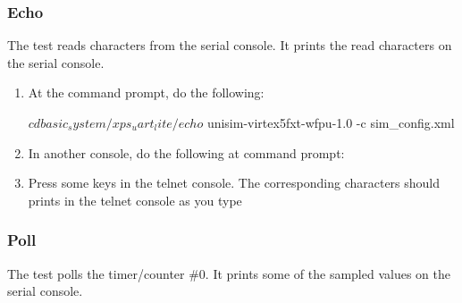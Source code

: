 \subsubsection{Echo}

The test reads characters from the serial console.
It prints the read characters on the serial console.

\begin{enumerate}
\item At the command prompt, do the following:
\begin{script}
$ cd basic_system/xps_uart_lite/echo
$ unisim-virtex5fxt-wfpu-1.0 -c sim_config.xml
\end{script}
\item In another console, do the following at command prompt:
\item Press some keys in the telnet console. The corresponding characters should prints in the telnet console as you type
\end{enumerate}

\subsubsection{Poll}

The test polls the timer/counter \#0.
It prints some of the sampled values on the serial console.

